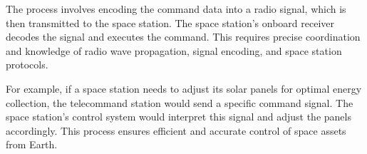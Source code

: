 The process involves encoding the command data into a radio signal, which is then transmitted to the space station. The space station’s onboard receiver decodes the signal and executes the command. This requires precise coordination and knowledge of radio wave propagation, signal encoding, and space station protocols.

For example, if a space station needs to adjust its solar panels for optimal energy collection, the telecommand station would send a specific command signal. The space station’s control system would interpret this signal and adjust the panels accordingly. This process ensures efficient and accurate control of space assets from Earth.

